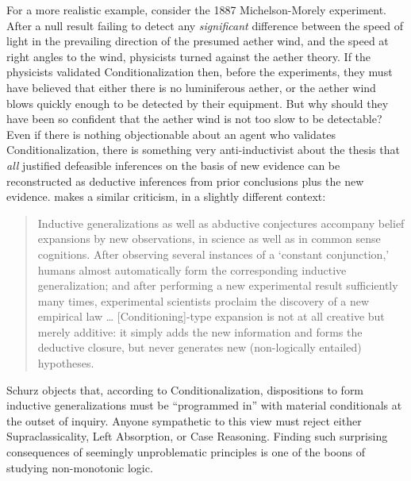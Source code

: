 For a more realistic example, consider the 1887 Michelson-Morely experiment.
After a null result failing to detect any {\em significant} difference between
the speed of light in the prevailing direction of the presumed aether wind, and
the speed at right angles to the wind, physicists turned against the aether
theory. If the physicists validated Conditionalization then, before the
experiments, they must have believed that either there is no luminiferous aether,
or the aether wind blows quickly enough to be detected by their equipment. But
why should they have been so confident that the aether wind is not too slow to
be detectable? Even if there is nothing objectionable about an agent who
validates Conditionalization, there is something very anti-inductivist about the
thesis that {\em all} justified defeasible inferences on the basis of new
evidence can be reconstructed as deductive inferences from prior conclusions
plus the new evidence. \citet{schurz2011abductive} makes a similar criticism, in
a slightly different context: 
\begin{quote}
Inductive generalizations as well as abductive conjectures accompany belief
expansions by new observations, in science as well as in common sense
cognitions. After observing several instances of a `constant conjunction,’
humans almost automatically form the corresponding inductive generalization; and
after performing a new experimental result sufficiently many times, experimental
scientists proclaim the discovery of a new empirical law \ldots
[Conditioning]-type expansion is not at all creative but merely additive: it
simply adds the new information and forms the deductive closure, but never
generates new (non-logically entailed) hypotheses.
\end{quote}
Schurz objects that, according to Conditionalization, dispositions to form
inductive generalizations must be ``programmed in'' with material conditionals
at the outset of inquiry. Anyone sympathetic to this view must reject either
Supraclassicality, Left Absorption, or Case Reasoning. Finding such surprising
consequences of seemingly unproblematic principles is one of the boons  of
studying non-monotonic logic.

